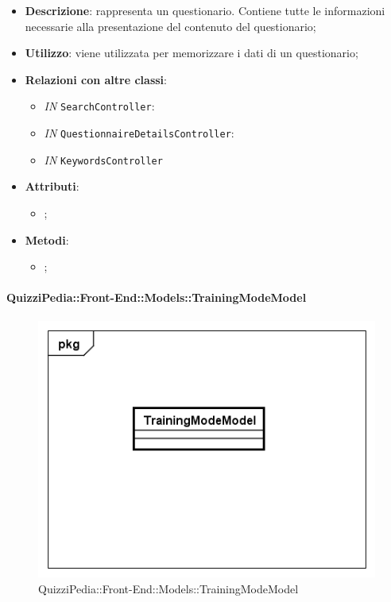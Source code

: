 		\begin{itemize}
			\item \textbf{Descrizione}: rappresenta un questionario. Contiene tutte le informazioni necessarie alla
			presentazione del contenuto del questionario;
			\item \textbf{Utilizzo}: viene utilizzata per memorizzare i dati di un questionario;
			\item \textbf{Relazioni con altre classi}: 
			\begin{itemize}
				\item \textit{IN} \texttt{SearchController}:
				\item \textit{IN} \texttt{QuestionnaireDetailsController}:
				  
				\item \textit{IN} \texttt{KeywordsController}
			\end{itemize}
			\item \textbf{Attributi}: 
			\begin{itemize}
				\item ;
			\end{itemize}
			\item \textbf{Metodi}: 
			\begin{itemize}
				\item ;
			\end{itemize}
		\end{itemize}	
		
		\paragraph{QuizziPedia::Front-End::Models::TrainingModeModel}
		
		\label{QuizziPedia::Front-End::Models::TrainingModeModel}
		
		\begin{figure}[h]
			\centering
			\includegraphics[scale=0.5,keepaspectratio]{UML/Classi/Front-End/QuizziPedia_Front-end_Models_TrainingModeModel.png}
			\caption{QuizziPedia::Front-End::Models::TrainingModeModel}
		\end{figure}
		
